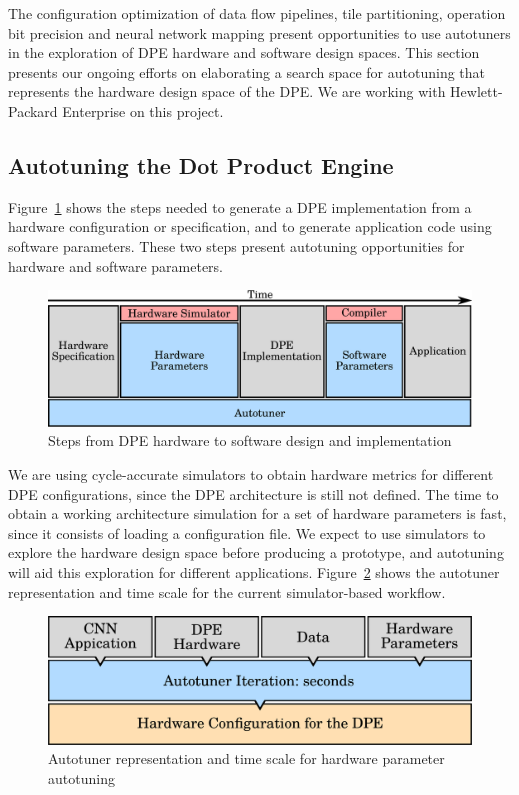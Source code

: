 The configuration optimization of data flow pipelines, tile partitioning,
operation bit precision and neural network mapping present opportunities to use
autotuners in the exploration of DPE hardware and software design spaces.  This
section presents our ongoing efforts on elaborating a search space for
autotuning that represents the hardware design space of the DPE.  We are
working with Hewlett-Packard Enterprise on this project.

\subsection{Autotuning the Dot Product Engine}

Figure~\ref{fig:dpe-stack} shows the steps needed to generate a DPE
implementation from a hardware configuration or specification, and to generate
application code using software parameters. These two steps present autotuning
opportunities for hardware and software parameters.

\begin{figure}[htpb]
    \centering
    \includegraphics[width=.65\textwidth]{./images/dpe-stack}
    \caption{Steps from DPE hardware to software design and implementation}
    \label{fig:dpe-stack}
\end{figure}

We are using cycle-accurate simulators to obtain hardware metrics for different
DPE configurations, since the DPE architecture is still not defined.  The time
to obtain a working architecture simulation for a set of hardware parameters is
fast, since it consists of loading a configuration file.  We expect to use
simulators to explore the hardware design space before producing a prototype,
and autotuning will aid this exploration for different applications.
Figure~\ref{fig:overview-dpe-hard} shows the autotuner representation and time
scale for the current simulator-based workflow.

\begin{figure}[htpb]
    \centering
    \includegraphics[width=.65\textwidth]{./images/overview_dpe_hard}
    \caption{Autotuner representation and time scale for hardware parameter
    autotuning}
    \label{fig:overview-dpe-hard}
\end{figure}


